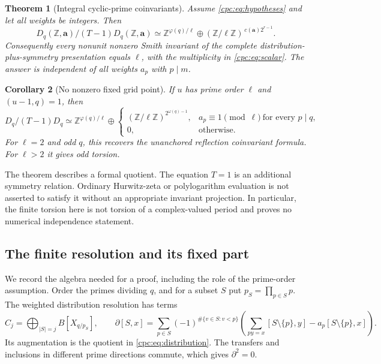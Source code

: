 \documentclass[11pt,a4paper]{article}
\numberwithin{equation}{section}
\newtheorem{theorem}{Theorem}[section]
\newtheorem{corollary}[theorem]{Corollary}
\theoremstyle{definition}
\theoremstyle{remark}
\begin{document}
\begin{theorem}[Integral cyclic-prime coinvariants]
\label{cpc:thm:scalar}
Assume \eqref{cpc:eq:hypotheses} and let all weights be integers.
Then
\begin{equation}\label{cpc:eq:scalar}
 \boxed{\displaystyle
 D_q(\mathbb Z,\mathbf a)/(T-1)D_q(\mathbb Z,\mathbf a)
 \simeq \mathbb Z^{\varphi(q)/\ell}
       \oplus (\mathbb Z/\ell\mathbb Z)^{\,c(\mathbf a)2^{r-1}}.}
\end{equation}
Consequently every nonunit nonzero Smith invariant of the complete
distribution-plus-symmetry presentation equals $\ell$, with the
multiplicity in \eqref{cpc:eq:scalar}. The answer is independent of
all weights $a_p$ with $p\mid m$.
\end{theorem}

\begin{corollary}[No nonzero fixed grid point]
\label{cpc:cor:fixedfree}
If $u$ has prime order $\ell$ and $(u-1,q)=1$, then
\[
 D_q/(T-1)D_q\simeq
 \mathbb Z^{\varphi(q)/\ell}\oplus
 \begin{cases}
 (\mathbb Z/\ell\mathbb Z)^{2^{\omega(q)-1}},
       &a_p\equiv1\pmod\ell\ \text{for every }p\mid q,\\
 0,&\text{otherwise}.
 \end{cases}
\]
For $\ell=2$ and odd $q$, this recovers the unanchored reflection
coinvariant formula. For $\ell>2$ it gives odd torsion.
\end{corollary}

The theorem describes a formal quotient. The equation $T=1$ is an
additional symmetry relation. Ordinary Hurwitz-zeta or polylogarithm
evaluation is not asserted to satisfy it without an appropriate
invariant projection. In particular, the finite torsion here is not
torsion of a complex-valued period and proves no numerical independence
statement.

\subsection{The finite resolution and its fixed part}

We record the algebra needed for a proof, including the role of the
prime-order assumption. Order the primes dividing $q$, and for a
subset $S$ put $p_S=\prod_{p\in S}p$. The weighted distribution
resolution has terms
\begin{equation}\label{cpc:eq:resolution}
 C_j=\bigoplus_{|S|=j}B[X_{q/p_S}],
 \qquad
 \partial[S,x]=\sum_{p\in S}(-1)^{\#\{v\in S:v<p\}}
 \left(\sum_{py=x}[S\setminus\{p\},y]
            -a_p[S\setminus\{p\},x]\right).
\end{equation}
Its augmentation is the quotient in \eqref{cpc:eq:distribution}.
The transfers and inclusions in different prime directions commute,
which gives $\partial^2=0$.
\end{document}
